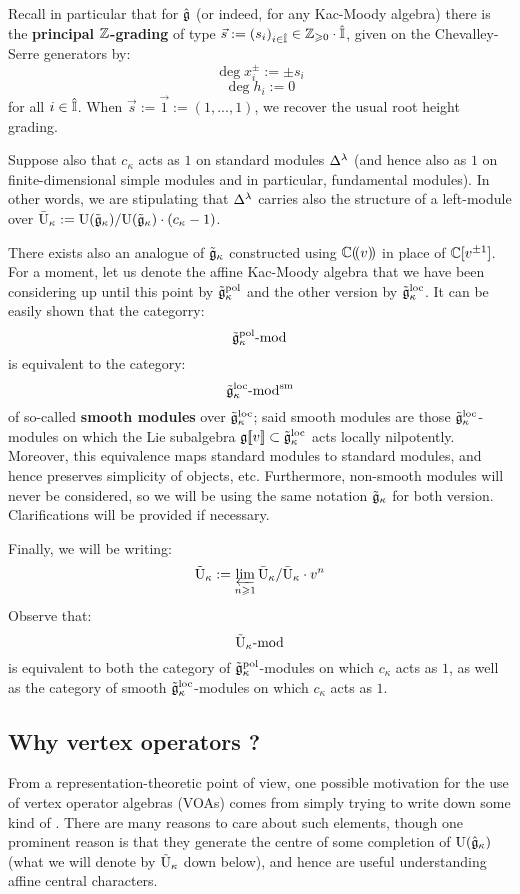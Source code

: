         Recall in particular that for $\hat{\mathfrak{g}}$ (or indeed, for any Kac-Moody algebra) there is the \textbf{principal $\mathbb{Z}$-grading} of type $\vec{s} := (s_i)_{i \in \hat{\mathbb{I}}} \in \mathbb{Z}_{\geqslant 0} \cdot \hat{\mathbb{I}}$, given on the Chevalley-Serre generators by:
            $$\deg x_i^{\pm} := \pm s_i$$
            $$\deg h_i := 0$$
        for all $i \in \hat{\mathbb{I}}$. When $\vec{s} := \vec{1} := (1, ..., 1)$, we recover the usual root height grading. 

        Suppose also that $c_{\kappa}$ acts as $1$ on standard modules $\Delta^{\lambda}$ (and hence also as $1$ on finite-dimensional simple modules and in particular, fundamental modules). In other words, we are stipulating that $\Delta^{\lambda}$ carries also the structure of a left-module over $\bar{\mathrm{U}}_{\kappa} := \mathrm{U}(\tilde{\mathfrak{g}}_{\kappa})/\mathrm{U}(\tilde{\mathfrak{g}}_{\kappa}) \cdot (c_{\kappa} - 1)$.

        There exists also an analogue of $\tilde{\mathfrak{g}}_{\kappa}$ constructed using $\mathbb{C}(\!(v)\!)$ in place of $\mathbb{C}[v^{\pm 1}]$. For a moment, let us denote the affine Kac-Moody algebra that we have been considering up until this point by $\tilde{\mathfrak{g}}_{\kappa}^{\mathrm{pol}}$ and the other version by $\tilde{\mathfrak{g}}_{\kappa}^{\mathrm{loc}}$. It can be easily shown that the categorry:
            $$\tilde{\mathfrak{g}}_{\kappa}^{\mathrm{pol}}\text{-}\mathrm{mod}$$
        is equivalent to the category:
            $$\tilde{\mathfrak{g}}_{\kappa}^{\mathrm{loc}}\text{-}\mathrm{mod}^{\mathrm{sm}}$$
        of so-called \textbf{smooth modules} over $\tilde{\mathfrak{g}}_{\kappa}^{\mathrm{loc}}$; said smooth modules are those $\tilde{\mathfrak{g}}_{\kappa}^{\mathrm{loc}}$-modules on which the Lie subalgebra $\mathfrak{g}[\![v]\!] \subset \tilde{\mathfrak{g}}_{\kappa}^{\mathrm{loc}}$ acts locally nilpotently. Moreover, this equivalence maps standard modules to standard modules, and hence preserves simplicity of objects, etc. Furthermore, non-smooth modules will never be considered, so we will be using the same notation $\tilde{\mathfrak{g}}_{\kappa}$ for both version. Clarifications will be provided if necessary.

        Finally, we will be writing:
            $$\tilde{\mathrm{U}}_{\kappa} := \varprojlim_{n \geqslant 1} \bar{\mathrm{U}}_{\kappa}/\bar{\mathrm{U}}_{\kappa} \cdot v^n$$
        Observe that:
            $$\tilde{\mathrm{U}}_{\kappa}\text{-}\mathrm{mod}$$
        is equivalent to both the category of $\tilde{\mathfrak{g}}_{\kappa}^{\mathrm{pol}}$-modules on which $c_{\kappa}$ acts as $1$, as well as the category of smooth $\tilde{\mathfrak{g}}_{\kappa}^{\mathrm{loc}}$-modules on which $c_{\kappa}$ acts as $1$.

    \subsection{Why vertex operators ?}
        From a representation-theoretic point of view, one possible motivation for the use of vertex operator algebras (VOAs) comes from simply trying to write down some kind of . There are many reasons to care about such elements, though one prominent reason is that they generate the centre of some completion of $\mathrm{U}(\hat{\mathfrak{g}}_{\kappa})$ (what we will denote by $\tilde{\mathrm{U}}_{\kappa}$ down below), and hence are useful understanding affine central characters. 
        
